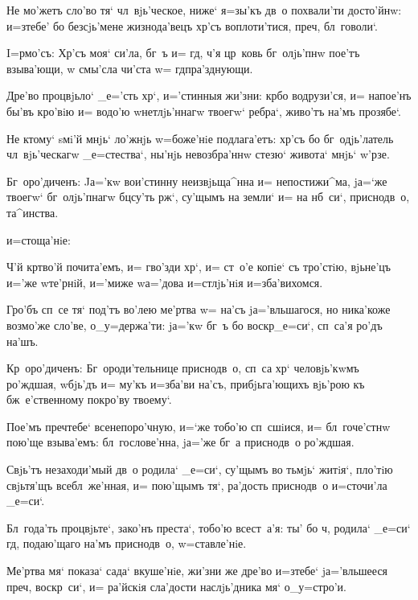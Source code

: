 Не мо'жетъ сло'во тя` чл~вjь'ческое, ниже` я=зы'къ 
дв~о похвали'ти досто'йнw: и=з\ъ тебе' бо без\ъ сjь'мене 
жизнода'вецъ хр'съ воплоти'тися, преч, 
бл~говоли`.


I=рмо'съ: Хр'съ моя` си'ла, бг~ъ и= гд, 
ч'я цр~ковь бг~олjь'пнw пое'тъ взыва'ющи, w\т 
смы'сла чи'ста w= гд пра'зднующи.

Дре'во процвjьло` _е='сть хр`, и='стинныя жи'зни: 
кр бо водрузи'ся, и= напое'нъ бы'въ кро'вiю и= водо'ю 
w\т нетлjь'ннагw твоегw` ребра`, живо'тъ на'мъ прозябе`.

Не ктому` sмi'й мнjь` ло'жнjь w=боже'нiе подлага'етъ: 
хр'съ бо бг~одjь'латель чл~вjь'ческагw _е=стества`, 
ны'нjь невозбра'ннw стезю` живота` мнjь` w'рзе.

Бг~оро'диченъ: Jа='кw вои'стинну неизвjьща^нна и= 
непостижи^ма, jа=`же твоегw` бг~олjь'пнагw бц су'ть 
рж`, су'щымъ на земли` и= на нб~си`, приснодв~о, 
та^инства.

и=стоща'нiе: 

Ч'й кр тво'й почита'емъ, и= гво'зди хр`, 
и= ст~о'е копiе` съ тро'стiю, вjьне'цъ и='же w\т те'рнiй, 
и='миже w\т а='дова и=стлjь'нiя и=зба'вихомся.

Гро'бъ сп~се тя` под'тъ во'лею ме'ртва w= на'съ 
jа='вльшагося, но ника'коже возмо'же сло'ве, 
о_у=держа'ти: jа='кw бг~ъ бо воскр _е=си`, сп~са'я 
ро'дъ на'шъ.

Кр~оро'диченъ: Бг~ороди'тельнице приснодв~о, 
сп~са хр` человjь'кwмъ ро'ждшая, w\т бjь'дъ и= му'къ 
и=зба'ви на'съ, прибjьга'ющихъ вjь'рою къ бж~е'ственному 
покро'ву твоему`. 


Пое'мъ преч тебе` всенепоро'чную, и=`же тобо'ю 
сп~сшiися, и= бл~гоче'стнw пою'ще взыва'емъ: 
бл~гослове'нна, jа='же бг~а приснодв~о ро'ждшая.

Свjь'тъ незаходи'мый дв~о родила` _е=си`, су'щымъ во 
тьмjь` житiя`, пло'тiю свjьтя'щъ всебл~же'нная, и= 
пою'щымъ тя`, ра'дость приснодв~о и=сточи'ла _е=си`.

Бл~года'ть процвjьте`, зако'нъ преста`, тобо'ю 
всест~а'я: ты' бо ч, родила` _е=си` гд, 
подаю'щаго на'мъ приснодв~о, w=ставле'нiе.

Ме'ртва мя` показа` сада` вкуше'нiе, жи'зни же дре'во 
и=з\ъ тебе` jа='вльшееся преч, воскр~си`, и= 
ра'йскiя сла'дости наслjь'дника мя` о_у=стро'и.

